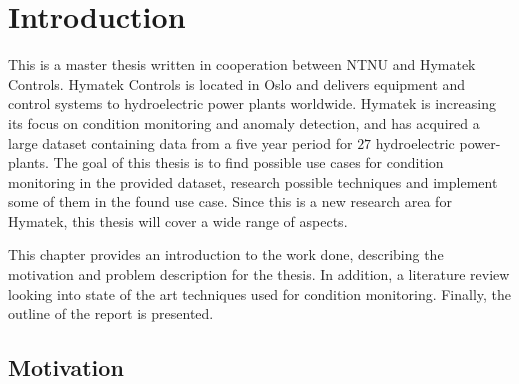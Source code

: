 \chapter{Introduction}\label{cha:introduction}
%

This is a master thesis written in cooperation between NTNU and Hymatek Controls. Hymatek Controls is located in Oslo and delivers equipment and control systems to hydroelectric power plants worldwide. Hymatek is increasing its focus on condition monitoring and anomaly detection, and has acquired a large dataset containing data from a five year period for $27$ hydroelectric power-plants. The goal of this thesis is to find possible use cases for condition monitoring in the provided dataset, research possible techniques and implement some of them in the found use case. Since this is a new research area for Hymatek, this thesis will cover a wide range of aspects. 

This chapter provides an introduction to the work done, describing the motivation and problem description for the thesis. In addition, a literature review looking into state of the art techniques used for condition monitoring. Finally, the outline of the report is presented. 


\section{Motivation}\label{sec:motivation}


